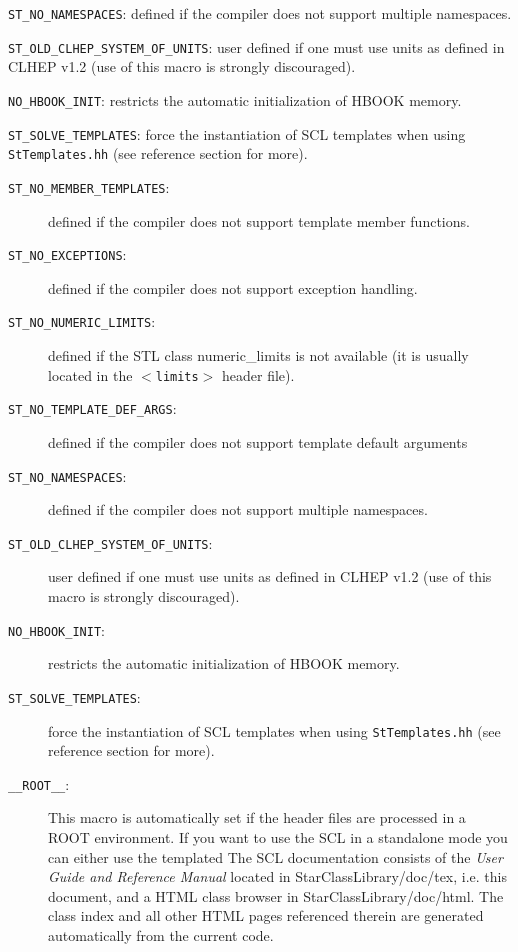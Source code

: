 \documentclass[twoside]{article}
\newcommand{\name}[1]{\textsf{#1}}%
\newcommand{\comp}[1]{\texttt{#1}}%
\begin{document}
\item[\comp{ST\_NO\_NAMESPACES}:] defined if the compiler does not support
  multiple namespaces.
\item[\comp{ST\_OLD\_CLHEP\_SYSTEM\_OF\_UNITS}:] user defined if one must use units as
  defined in CLHEP v1.2 (use of this macro is strongly discouraged).
\item[\comp{NO\_HBOOK\_INIT}:] restricts the automatic initialization of HBOOK
  memory.
\item[\comp{ST\_SOLVE\_TEMPLATES}:] force the instantiation of SCL templates when using
    \texttt{StTemplates.hh} (see reference section for more).

\begin{description}
\item[\comp{ST\_NO\_MEMBER\_TEMPLATES}:] defined if the compiler does
    not support template member functions.
\item[\comp{ST\_NO\_EXCEPTIONS}:] defined if the compiler does not
    support exception handling. 
\item[\comp{ST\_NO\_NUMERIC\_LIMITS}:] defined if the STL class
    \name{numeric\_limits} is not available (it is usually located in
    the $<$\comp{limits}$>$ header file).
\item[\comp{ST\_NO\_TEMPLATE\_DEF\_ARGS}:] defined if the compiler
    does not support template default arguments
\item[\comp{ST\_NO\_NAMESPACES}:] defined if the compiler does not
    support multiple namespaces.
\item[\comp{ST\_OLD\_CLHEP\_SYSTEM\_OF\_UNITS}:] user defined if one
    must use units as defined in CLHEP v1.2 (use of this macro is
    strongly discouraged).
\item[\comp{NO\_HBOOK\_INIT}:] restricts the automatic initialization
    of HBOOK memory.
\item[\comp{ST\_SOLVE\_TEMPLATES}:] force the instantiation of SCL
    templates when using \texttt{StTemplates.hh} (see reference
    section for more).
\item[\comp{\_\_ROOT\_\_}:] This macro is automatically set if the
    header files are processed in a ROOT environment. If you want to
    use the SCL in a standalone mode you can either use the templated
The SCL documentation consists of the {\em User Guide and
    Reference Manual} located in \name{StarClassLibrary/doc/tex}, i.e.
this document, and a \name{HTML} class browser in
\name{StarClassLibrary/doc/html}.
The class index and all other \name{HTML} pages referenced therein are generated
automatically from the current code. 


\end{description}
\end{document}
